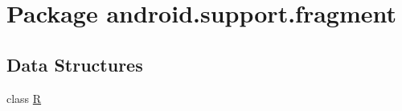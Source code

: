\hypertarget{namespaceandroid_1_1support_1_1fragment}{}\section{Package android.\+support.\+fragment}
\label{namespaceandroid_1_1support_1_1fragment}
\subsection*{Data Structures}
\begin{DoxyCompactItemize}
\item 
class \mbox{\hyperlink{classandroid_1_1support_1_1fragment_1_1_r}{R}}
\end{DoxyCompactItemize}
